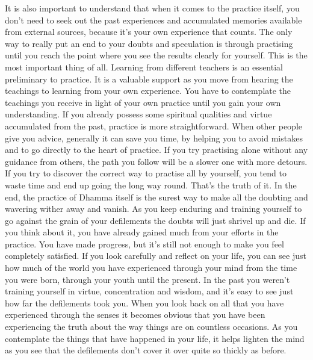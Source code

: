 It is also important to understand that when it comes to the practice itself, you don't need to seek out the past experiences and accumulated memories available from external sources, because it's your own experience that counts. The only way to really put an end to your doubts and speculation is through practising until you reach the point where you see the results clearly for yourself. This is the most important thing of all. Learning from different teachers is an essential preliminary to practice. It is a valuable support as you move from hearing the teachings to learning from your own experience. You have to contemplate the teachings you receive in light of your own practice until you gain your own understanding. If you already possess some spiritual qualities and virtue accumulated from the past, practice is more straightforward. When other people give you advice, generally it can save you time, by helping you to avoid mistakes and to go directly to the heart of practice. If you try practising alone without any guidance from others, the path you follow will be a slower one with more detours. If you try to discover the correct way to practise all by yourself, you tend to waste time and end up going the long way round. That's the truth of it. In the end, the practice of Dhamma itself is the surest way to make all the doubting and wavering wither away and vanish. As you keep enduring and training yourself to go against the grain of your defilements the doubts will just shrivel up and die. If you think about it, you have already gained much from your efforts in the practice. You have made progress, but it's still not enough to make you feel completely satisfied. If you look carefully and reflect on your life, you can see just how much of the world you have experienced through your mind from the time you were born, through your youth until the present. In the past you weren't training yourself in virtue, concentration and wisdom, and it's easy to see just how far the defilements took you. When you look back on all that you have experienced through the senses it becomes obvious that you have been experiencing the truth about the way things are on countless occasions. As you contemplate the things that have happened in your life, it helps lighten the mind as you see that the defilements don't cover it over quite so thickly as before. 

